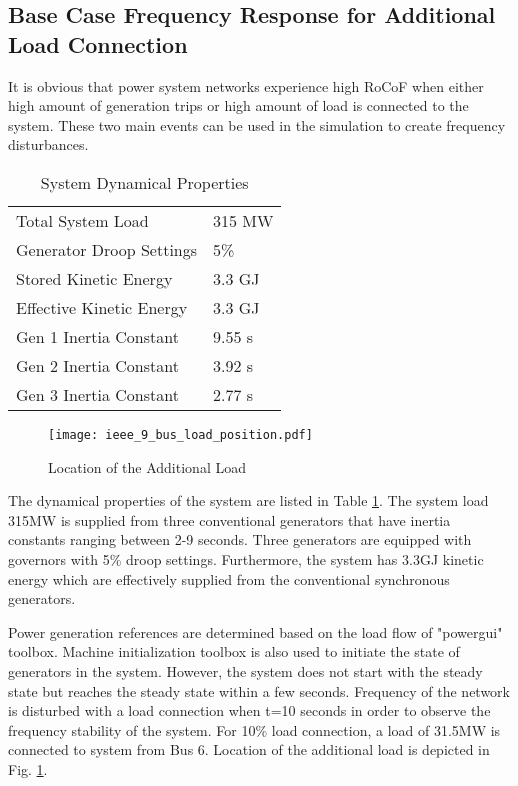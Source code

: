 \subsection{Base Case Frequency Response for Additional Load Connection}
It is obvious that power system networks experience high RoCoF when either high amount of generation trips or high amount of load is connected to the system. These two main events can be used in the simulation to create frequency disturbances.\par
\begin{table}[h]
	\centering
	\begin{tabular}{ll}
		\hline
		Total System Load                      & 315 MW    \\
		Generator Droop Settings               & 5\%       \\
		Stored Kinetic Energy                  & 3.3 GJ \\
		Effective Kinetic Energy               & 3.3 GJ \\
		Gen 1 Inertia Constant                 & 9.55 s  \\
		Gen 2 Inertia Constant                 & 3.92 s  \\
		Gen 3 Inertia Constant                 & 2.77 s  \\ \hline
	\end{tabular}
	\caption{System Dynamical Properties}
	\label{systemdynamicaldata}
\end{table}
\begin{figure}[h!]
	\centering
	\texttt{[image: ieee\_9\_bus\_load\_position.pdf]}
	\caption{Location of the Additional Load}
	\label{ieee_9_bus_load}
\end{figure}
The dynamical properties of the system are listed in Table \ref{systemdynamicaldata}. The system load 315MW is supplied from three conventional generators that have inertia constants ranging between 2-9 seconds. Three generators are equipped with governors with 5\% droop settings. Furthermore, the system has 3.3GJ kinetic energy which are effectively supplied from the conventional synchronous generators. \par 
Power generation references are determined based on the load flow of "powergui" toolbox. Machine initialization toolbox is also used to initiate the state of generators in the system. However, the system does not start with the steady state but reaches the steady state within a few seconds. Frequency of the network is disturbed with a load connection when t=10 seconds in order to observe the frequency stability of the system. For 10\% load connection, a load of 31.5MW is connected to system from Bus 6. Location of the additional load is depicted in Fig. \ref{ieee_9_bus_load}.\par
